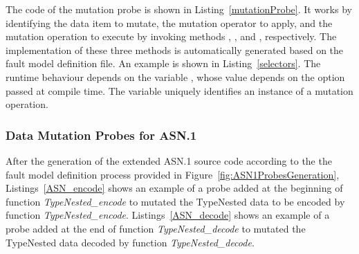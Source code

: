 The code of the mutation probe is shown in Listing~\ref{mutationProbe}. It works by identifying the data item to mutate, the mutation operator to apply, and the mutation operation to execute by invoking methods ,
, and , respectively. The implementation of these three methods is automatically generated based on the fault model definition file.
An example is shown in Listing~\ref{selectors}. The runtime behaviour depends on the variable , whose value depends on the option passed at compile time. 
The variable  uniquely identifies an instance of a mutation operation.












\subsubsection{Data Mutation Probes for ASN.1}
\label{sec:FAQASDataMutationProbesASN}




After the generation of the extended ASN.1 source code according to the 
the fault model definition process provided in Figure~\ref{fig:ASN1ProbesGeneration}, 
Listings~\ref{ASN_encode} shows an example of a probe added at the beginning of function \emph{TypeNested\_encode} to mutated the TypeNested data to be encoded by function \emph{TypeNested\_encode}.
Listings~\ref{ASN_decode} shows an example of a probe added 
at the end of function \emph{TypeNested\_decode}
to mutated the TypeNested data decoded by function \emph{TypeNested\_decode}.

